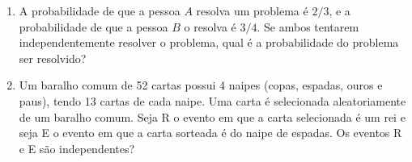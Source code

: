 \documentclass{article}
\begin{document}
\begin{enumerate}
    \item A probabilidade de que a pessoa $A$ resolva um problema é $2/3$, e a probabilidade de que a 	pessoa $B$ o resolva é $3/4$. Se ambos tentarem independentemente resolver o problema, qual é a probabilidade do problema ser resolvido?
	
	
	\item Um baralho comum de 52 cartas possui 4 naipes (copas, espadas, ouros e paus), tendo 13 cartas de cada naipe. Uma carta é selecionada aleatoriamente de um baralho comum. Seja R o evento em que a carta selecionada é um rei e seja E o evento em que a carta sorteada é do naipe de espadas. Os eventos R e E são independentes?
	    
    
    
%    
    

\end{enumerate}
\end{document}
